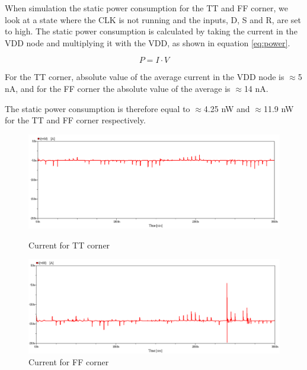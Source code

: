 When simulation the static power consumption for the TT and FF corner, we look at a state where the CLK is not running and the inputs, D, S and R, are set to high. The static power consumption is calculated by taking the current in the VDD node and multiplying it with the VDD, as shown in equation \ref{eq:power}.

\begin{equation}
    \label{eq:power}
    P = I \cdot V
\end{equation}

For the TT corner, absolute value of the average current in the VDD node is $\approx$5 nA, and for the FF corner the absolute value of the average is $\approx$14 nA.

The static power consumption is therefore equal to $\approx$4.25 nW and $\approx$11.9 nW for the TT and FF corner respectively.

\begin{figure}[H]
\begin{minipage}{0.5\textwidth}
    \centering
    \includegraphics[width=\linewidth]{Figures/Current_VDD_TT.png}
    \caption{Current for TT corner}
    \label{fig:currentTT}
\end{minipage}
\begin{minipage}{0.5\textwidth}
    \centering
    \includegraphics[width=\linewidth]{Figures/Current_VDD_FF.png}
    \caption{Current for FF corner}
    \label{fig:currentFF}
\end{minipage}
\end{figure}

